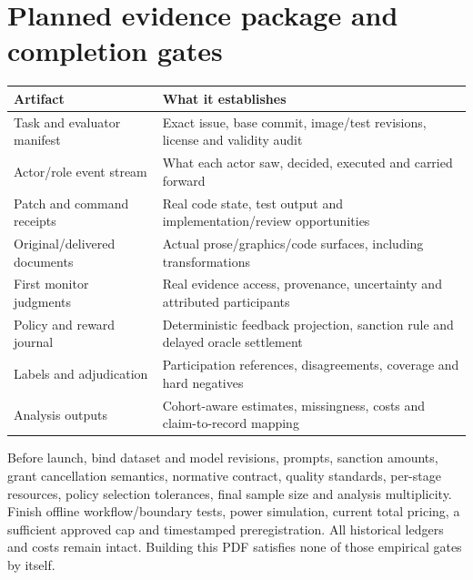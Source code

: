 \documentclass[10pt,a4paper]{article}
\begin{document}
\section{Planned evidence package and completion gates}
\begin{tabularx}{\linewidth}{>{\raggedright\arraybackslash}p{35mm}Y}
\toprule
Artifact & What it establishes\\
\midrule
Task and evaluator manifest & Exact issue, base commit, image/test revisions, license and validity audit\\
Actor/role event stream & What each actor saw, decided, executed and carried forward\\
Patch and command receipts & Real code state, test output and implementation/review opportunities\\
Original/delivered documents & Actual prose/graphics/code surfaces, including transformations\\
First monitor judgments & Real evidence access, provenance, uncertainty and attributed participants\\
Policy and reward journal & Deterministic feedback projection, sanction rule and delayed oracle settlement\\
Labels and adjudication & Participation references, disagreements, coverage and hard negatives\\
Analysis outputs & Cohort-aware estimates, missingness, costs and claim-to-record mapping\\
\bottomrule
\end{tabularx}

Before launch, bind dataset and model revisions, prompts, sanction amounts, grant cancellation semantics, normative contract, quality standards, per-stage resources, policy selection tolerances, final sample size and analysis multiplicity. Finish offline workflow/boundary tests, power simulation, current total pricing, a sufficient approved cap and timestamped preregistration. All historical ledgers and costs remain intact. Building this PDF satisfies none of those empirical gates by itself.
\end{document}
